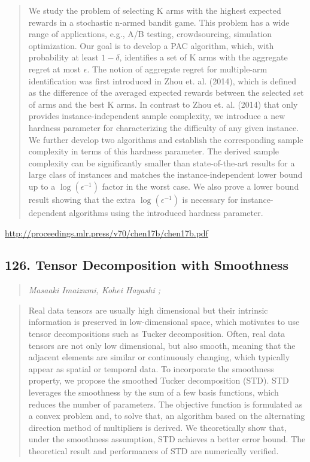 \documentclass{article}
\begin{document}
\begin{quote}
    We study the problem of selecting K arms with the highest expected rewards in a stochastic n-armed bandit game. This problem has a wide range of applications, e.g., A/B testing, crowdsourcing, simulation optimization. Our goal is to develop a PAC algorithm, which, with probability at least $1-\delta$, identifies a set of K arms with the aggregate regret at most $\epsilon$. The notion of aggregate regret for multiple-arm identification was first introduced in Zhou et. al. (2014), which is defined as the difference of the averaged expected rewards between the selected set of arms and the best K arms. In contrast to Zhou et. al. (2014) that only provides instance-independent sample complexity, we introduce a new hardness parameter for characterizing the difficulty of any given instance. We further develop two algorithms and establish the corresponding sample complexity in terms of this hardness parameter. The derived sample complexity can be significantly smaller than state-of-the-art results for a large class of instances and matches the instance-independent lower bound up to a $\log(\epsilon^{-1})$ factor in the worst case. We also prove a lower bound result showing that the extra $\log(\epsilon^{-1})$ is necessary for instance-dependent algorithms using the introduced hardness parameter.  \end{quote}

\href{http://proceedings.mlr.press/v70/chen17b/chen17b.pdf}{http://proceedings.mlr.press/v70/chen17b/chen17b.pdf}

\subsection{126. Tensor Decomposition with Smoothness}

\begin{quote}
\footnotesize{\textit{Masaaki Imaizumi, Kohei Hayashi ;}}
\end{quote}

\begin{quote}
    Real data tensors are usually high dimensional but their intrinsic information is preserved in low-dimensional space, which motivates to use tensor decompositions such as Tucker decomposition. Often, real data tensors are not only low dimensional, but also smooth, meaning that the adjacent elements are similar or continuously changing, which typically appear as spatial or temporal data. To incorporate the smoothness property, we propose the smoothed Tucker decomposition (STD). STD leverages the smoothness by the sum of a few basis functions, which reduces the number of parameters. The objective function is formulated as a convex problem and, to solve that, an algorithm based on the alternating direction method of multipliers is derived. We theoretically show that, under the smoothness assumption, STD achieves a better error bound. The theoretical result and performances of STD are numerically verified.  \end{quote}
\end{document}
